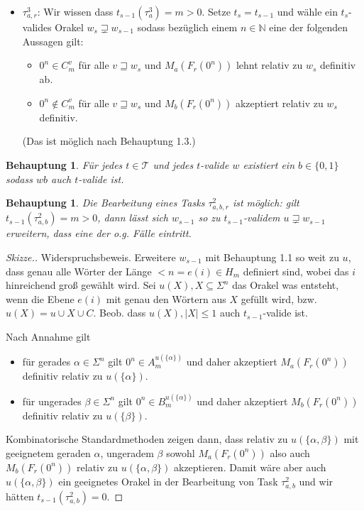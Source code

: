 \documentclass[nofonts]{uebung}
\newtheorem{claim}[theorem]{Behauptung}
\theoremstyle{definition}
\DeclareMathOperator{\img}{img}
\begin{document}
\begin{itemize}
        Ansonsten wähle ein hinreichend großes $m\not\in \img(t_s)$ sodass $w_s$ kein Wort der Länge $\min H_m$ definiert. Setze $t_s\coloneqq t_{s-1}\cup \{ \tau^3_{a,b}\mapsto m \}$; damit ist $w_{s-1}$ auch $t_s$-valide. Setze $w_s\coloneqq w_{s-1}y$ für geeignetes $y\in\{0,1\}$ sodass $w_s$ auch $t_s$-valide ist. (Das ist möglich nach Behauptung 1.1.)

    \item $\tau^3_{a,r}$: Wir wissen dass $t_{s-1}(\tau^3_{a})=m>0$. Setze $t_s=t_{s-1}$ und wähle ein $t_s$-valides Orakel $w_s\sqsupsetneq w_{s-1}$ sodass bezüglich einem $n\in\mathbb N$ eine der folgenden Aussagen gilt:
        \begin{itemize}[nosep,endpenalty=10000]
            \item $0^n\in C_m^v$ für alle $v\sqsupseteq w_s$ und $M_a(F_r(0^n))$ lehnt relativ zu $w_s$ definitiv ab.
            \item $0^n\not\in C_m^v$ für alle $v\sqsupseteq w_s$ und $M_b(F_r(0^n))$ akzeptiert relativ zu $w_s$ definitiv.
        \end{itemize} (Das ist möglich nach Behauptung 1.3.)
\end{itemize}

\begin{claim}
    Für jedes $t\in\mathcal T$ und jedes $t$-valide $w$ existiert ein $b\in\{0,1\}$ sodass $wb$ auch $t$-valide ist.
\end{claim}

\begin{claim}
    Die Bearbeitung eines Tasks $\tau^2_{a,b,r}$ ist möglich: gilt $t_{s-1}(\tau^2_{a,b})=m>0$, dann lässt sich $w_{s-1}$ so zu $t_{s-1}$-validem $u\sqsupsetneq w_{s-1}$ erweitern, dass eine der o.g. Fälle eintritt.
\end{claim}
\begin{proof}[Skizze.]
    Widerspruchsbeweis. Erweitere $w_{s-1}$ mit Behauptung 1.1 so weit zu $u$, dass genau alle Wörter der Länge $<n=e(i)\in H_m$ definiert sind, wobei das $i$ hinreichend groß gewählt wird. Sei $u(X), X\subseteq \Sigma^n$ das Orakel was entsteht, wenn die Ebene $e(i)$ mit genau den Wörtern aus $X$ gefüllt wird, bzw. $u(X)=u\cup X \cup C$. Beob. dass $u(X), |X|\leq 1$ auch $t_{s-1}$-valide ist.

    Nach Annahme gilt
    \begin{itemize}
        \item für gerades $\alpha\in \Sigma^n$ gilt $0^n\in A_m^{u(\{\alpha\})}$ und daher akzeptiert $M_a(F_r(0^n))$ definitiv relativ zu $u(\{\alpha\})$.
        \item für ungerades $\beta\in \Sigma^n$ gilt $0^n\in B_m^{u(\{\alpha\})}$ und daher akzeptiert $M_b(F_r(0^n))$ definitiv relativ zu $u(\{\beta\})$.
    \end{itemize}
    Kombinatorische Standardmethoden zeigen dann, dass relativ zu $u(\{\alpha,\beta\})$ mit geeignetem geraden $\alpha$, ungeradem $\beta$ sowohl $M_a(F_r(0^n))$ also auch $M_b(F_r(0^n))$ relativ zu $u(\{\alpha,\beta\})$ akzeptieren.
    Damit wäre aber auch $u(\{\alpha,\beta\})$ ein geeignetes Orakel in der Bearbeitung von Task $\tau^2_{a,b}$ und wir hätten $t_{s-1}(\tau^2_{a,b})=0$.
\end{proof}
\end{document}
